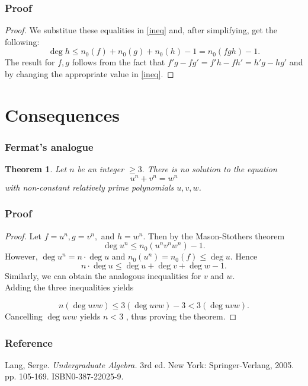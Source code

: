 \documentclass[envcountsect]{beamer}
\newtheorem*{theorem*}{Theorem}
\begin{document}
\begin{frame}
  \frametitle{Proof}
  \begin{proof}
We substitue these equalities in \eqref{ineq} and, after simplifying, get the
following:
\[
 \operatorname{deg}h \leq n_0(f) + n_0(g) + n_0(h) - 1 = n_0(fgh) - 1.
\]
The result for $f,g$ follows from the fact that $f'g - fg' = f'h - fh' =
h'g-hg'$ and by changing the appropriate value in \eqref{ineq}.

  \end{proof}
\end{frame}

\section{Consequences}
\begin{frame}
\frametitle{Fermat's analogue} 
\begin{theorem*}
Let $n$ be an integer $\geq 3.$ There is no solution to the equation \[u^n +
  v^n = w^n\] with non-constant relatively prime polynomials $u,v,w$. 
\end{theorem*}



\end{frame}

\begin{frame}
  \frametitle{Proof}

  \begin{proof}
    \small
    Let $f =u^n, g = v^n,$ and $h=w^n.$ Then by the Mason-Stothers theorem
    \[
      \operatorname{deg}u^n \leq n_0(u^nv^nw^n) - 1.
    \]
    However, $\operatorname{deg}u^n=n \cdot \operatorname{deg}u$ and $n_0(u^n) =
    n_0(f) \leq \operatorname{deg}u.$ Hence 
\[
  n \cdot \operatorname{deg}u \leq \operatorname{deg}u + \operatorname{deg}v +
  \operatorname{deg}w - 1.
\]
   Similarly, we can obtain the analogous inequalities for $v$ and $w.$ \\
Adding the three inequalities yields

\[
  n(\operatorname{deg}uvw) \leq 3(\operatorname{deg}uvw) -3 < 3(\operatorname{deg}uvw).
\]
Cancelling $\operatorname{deg}uvw$ yields $ n < 3$ , thus proving the theorem.
\end{proof}
\end{frame}

\begin{frame}
  \frametitle{Reference}
  Lang, Serge. \textit{Undergraduate Algebra.} 3rd ed. New York:
  Springer-Verlang, 2005. pp. 105-169. ISBN0-387-22025-9.
\end{frame}  
\end{document}
